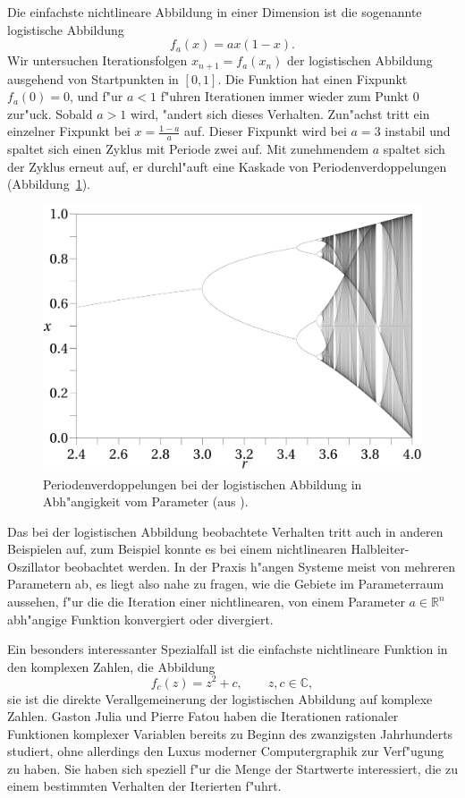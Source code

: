 \begin{refsection}
Die einfachste nichtlineare Abbildung in einer Dimension ist
die sogenannte logistische Abbildung \cite{julia:logistic}
\[
f_a(x)=ax(1-x).
\]
Wir untersuchen Iterationsfolgen $x_{n+1}=f_a(x_n)$ der logistischen Abbildung
ausgehend von Startpunkten in $[0,1]$.
Die Funktion hat einen Fixpunkt $f_a(0)=0$, und f"ur $a < 1$ f"uhren Iterationen
immer wieder zum Punkt $0$ zur"uck.
Sobald $a>1$ wird, "andert sich dieses Verhalten.
Zun"achst tritt ein einzelner Fixpunkt bei $x=\frac{1-a}a$ auf.
Dieser Fixpunkt wird bei $a=3$ instabil und spaltet sich einen Zyklus 
mit Periode zwei auf.
Mit zunehmendem $a$ spaltet sich der Zyklus erneut auf, er durchl"auft
eine Kaskade von Periodenverdoppelungen
(Abbildung~\ref{julia:periodenverdoppelung}).
\begin{figure}
\begin{center}
\includegraphics[width=0.7\hsize]{julia/logistic.png}
\end{center}
\caption{Periodenverdoppelungen bei der logistischen Abbildung in
Abh"angigkeit vom Parameter (aus \cite{julia:logistic}).
\label{julia:periodenverdoppelung}}
\end{figure}

Das bei der logistischen Abbildung beobachtete Verhalten tritt auch in
anderen Beispielen auf, zum Beispiel konnte es bei einem nichtlinearen
Halbleiter-Oszillator beobachtet werden.
In der Praxis h"angen Systeme meist von mehreren Parametern ab, es liegt
also nahe zu fragen, wie die Gebiete im Parameterraum aussehen, f"ur
die die Iteration einer nichtlinearen, von einem Parameter $a\in\mathbb R^n$
abh"angige Funktion konvergiert oder divergiert.

Ein besonders interessanter Spezialfall ist die einfachste nichtlineare
Funktion in den komplexen Zahlen, die Abbildung
\[
f_c(z)=z^2 + c,\qquad z,c\in\mathbb C,
\]
sie ist die direkte Verallgemeinerung der logistischen Abbildung auf
komplexe Zahlen.
Gaston Julia und Pierre Fatou haben die Iterationen rationaler 
Funktionen komplexer Variablen bereits zu Beginn des zwanzigsten
Jahrhunderts studiert, ohne allerdings den Luxus moderner Computergraphik
zur Verf"ugung zu haben. Sie haben sich speziell f"ur die Menge der
Startwerte interessiert, die zu einem bestimmten Verhalten der
Iterierten f"uhrt.


\end{refsection}
